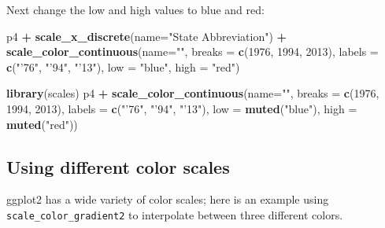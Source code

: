 \documentclass[]{book}
\newenvironment{Shaded}{\begin{snugshade}}{\end{snugshade}}
\newcommand{\KeywordTok}[1]{\textcolor[rgb]{0.13,0.29,0.53}{\textbf{#1}}}
\newcommand{\DataTypeTok}[1]{\textcolor[rgb]{0.13,0.29,0.53}{#1}}
\newcommand{\DecValTok}[1]{\textcolor[rgb]{0.00,0.00,0.81}{#1}}
\newcommand{\StringTok}[1]{\textcolor[rgb]{0.31,0.60,0.02}{#1}}
\newcommand{\OperatorTok}[1]{\textcolor[rgb]{0.81,0.36,0.00}{\textbf{#1}}}
\newcommand{\NormalTok}[1]{#1}
\begin{document}
Next change the low and high values to blue and red:

\begin{Shaded}
\begin{Highlighting}[]
\NormalTok{p4 }\OperatorTok{+}
\StringTok{  }\KeywordTok{scale_x_discrete}\NormalTok{(}\DataTypeTok{name=}\StringTok{"State Abbreviation"}\NormalTok{) }\OperatorTok{+}
\StringTok{  }\KeywordTok{scale_color_continuous}\NormalTok{(}\DataTypeTok{name=}\StringTok{""}\NormalTok{,}
                         \DataTypeTok{breaks =} \KeywordTok{c}\NormalTok{(}\DecValTok{1976}\NormalTok{, }\DecValTok{1994}\NormalTok{, }\DecValTok{2013}\NormalTok{),}
                         \DataTypeTok{labels =} \KeywordTok{c}\NormalTok{(}\StringTok{"'76"}\NormalTok{, }\StringTok{"'94"}\NormalTok{, }\StringTok{"'13"}\NormalTok{),}
                         \DataTypeTok{low =} \StringTok{"blue"}\NormalTok{, }\DataTypeTok{high =} \StringTok{"red"}\NormalTok{)}
\end{Highlighting}
\end{Shaded}

\begin{Shaded}
\begin{Highlighting}[]
\KeywordTok{library}\NormalTok{(scales)}
\NormalTok{p4 }\OperatorTok{+}
\StringTok{  }\KeywordTok{scale_color_continuous}\NormalTok{(}\DataTypeTok{name=}\StringTok{""}\NormalTok{,}
                         \DataTypeTok{breaks =} \KeywordTok{c}\NormalTok{(}\DecValTok{1976}\NormalTok{, }\DecValTok{1994}\NormalTok{, }\DecValTok{2013}\NormalTok{),}
                         \DataTypeTok{labels =} \KeywordTok{c}\NormalTok{(}\StringTok{"'76"}\NormalTok{, }\StringTok{"'94"}\NormalTok{, }\StringTok{"'13"}\NormalTok{),}
                         \DataTypeTok{low =} \KeywordTok{muted}\NormalTok{(}\StringTok{"blue"}\NormalTok{), }\DataTypeTok{high =} \KeywordTok{muted}\NormalTok{(}\StringTok{"red"}\NormalTok{))}
\end{Highlighting}
\end{Shaded}

\subsection{Using different color
scales}\label{using-different-color-scales}

ggplot2 has a wide variety of color scales; here is an example using
\texttt{scale\_color\_gradient2} to interpolate between three different
colors.
\end{document}
